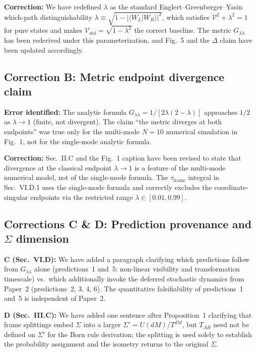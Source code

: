 \documentclass[12pt]{article}
\begin{document}
\textbf{Correction:} We have redefined $\lambda$ as the standard
Englert--Greenberger--Yasin which-path distinguishability
$\lambda \equiv \sqrt{1-|\langle W_L|W_R\rangle|^2}$, which satisfies
$\mathcal{V}^2 + \lambda^2 = 1$ for pure states and makes
$\mathcal{V}_\mathrm{std} = \sqrt{1-\lambda^2}$ the correct baseline.
The metric $G_{\lambda\lambda}$ has been rederived under this parameterization,
and Fig.~5 and the $\Delta$ claim have been updated accordingly.

\subsection*{Correction B: Metric endpoint divergence claim}
\textbf{Error identified:} The analytic formula $G_{\lambda\lambda} =
1/[2\lambda(2-\lambda)]$ approaches $1/2$ as $\lambda \to 1$ (finite, not divergent).
The claim ``the metric diverges at both endpoints'' was true only for the multi-mode
$N = 10$ numerical simulation in Fig.~1, not for the single-mode analytic formula.

\textbf{Correction:} Sec.~II.C and the Fig.~1 caption have been revised to state
that divergence at the classical endpoint $\lambda \to 1$ is a feature of the
multi-mode numerical model, not of the single-mode formula. The $\tau_\mathrm{frame}$
integral in Sec.~VI.D.1 uses the single-mode formula and correctly excludes the
coordinate-singular endpoints via the restricted range $\lambda \in [0.01, 0.99]$.

\subsection*{Corrections C \& D: Prediction provenance and $\Sigma$ dimension}
\textbf{C (Sec.~VI.D):} We have added a paragraph clarifying which predictions
follow from $G_{\lambda\lambda}$ alone (predictions~1 and~5: non-linear visibility
and transformation timescale) vs.\ which additionally invoke the deferred stochastic
dynamics from Paper~2 (predictions~2, 3, 4, 6). The quantitative falsifiability of
predictions~1 and~5 is independent of Paper~2.

\textbf{D (Sec.~III.C):} We have added one sentence after Proposition~1 clarifying
that frame splittings embed $\Sigma$ into a larger $\Sigma' = U(dM)/T^{dM}$, but
$T_{AB}$ need not be defined on $\Sigma'$ for the Born rule derivation; the splitting
is used solely to establish the probability assignment and the isometry returns to the
original $\Sigma$.
\end{document}
